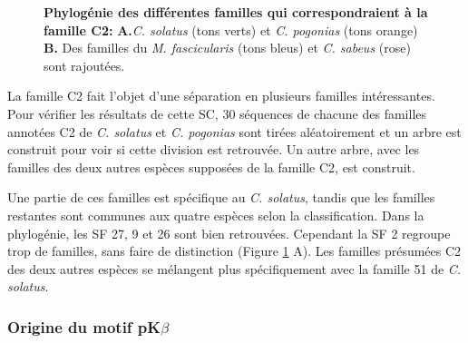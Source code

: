 \documentclass[12pt,a4paper]{article}
\begin{document}
\begin{figure}
\begin{tabular}{cccc}
	\end{tabular}
	\caption{\textbf{Phylogénie des différentes familles qui correspondraient à la famille C2:}
	\textbf{A.}\textit{C. solatus} (tons verts) et \textit{C. pogonias} (tons orange) \textbf{B.} Des familles du \textit{M. fascicularis} (tons bleus) et \textit{C. sabeus} (rose) sont rajoutées.	 
	\label{tree_C2}} 
\end{figure}

		La famille C2 fait l'objet d'une séparation en plusieurs familles intéressantes. Pour vérifier les résultats de cette SC, 30 séquences de chacune des familles annotées C2 de \textit{C. solatus} et \textit{C. pogonias} sont tirées aléatoirement et un arbre est construit pour voir si cette division est retrouvée. Un autre arbre,  avec les familles des deux autres espèces supposées de la famille C2,  est construit.
		
		Une partie de ces familles est spécifique au \textit{C. solatus}, tandis que les familles restantes sont communes aux quatre espèces selon la classification. Dans la phylogénie, les SF 27, 9 et 26 sont bien retrouvées. Cependant la SF 2 regroupe trop de familles, sans faire de distinction (Figure \ref{tree_C2} A). Les familles présumées C2 des deux autres espèces se mélangent plus spécifiquement avec la famille 51 de \textit{C. solatus}.
						
	\subsubsection{Origine du motif pK$\beta$}
	
\end{document}
